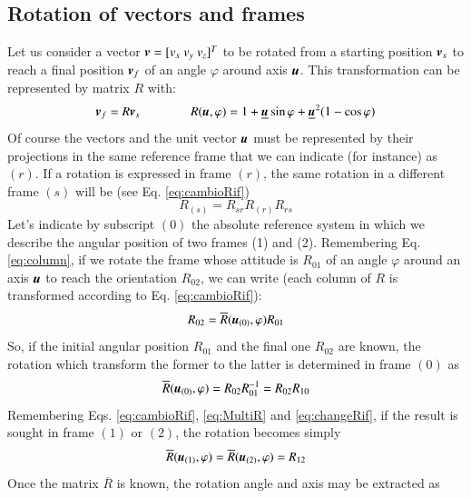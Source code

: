 \subsection{Rotation of vectors and frames}
\label{app:RotatMatrix2}
Let us consider a vector $\vect{v} = [v_x\ v_y\ v_z]^T$ to be rotated from a starting position ${\boldsymbol{v}}_s$ to reach a final position ${\boldsymbol{v}}_f$ of an angle $\varphi$ around axis ${\boldsymbol{u}}$. This transformation can be represented by matrix $R$ with:
\begin{equation}
    {\boldsymbol{v}}_f = R {\boldsymbol{v}}_s 
    \qquad\qquad 
    R({\boldsymbol{u}},\varphi) = 1 + \underline{{\boldsymbol{u}}}\sin\varphi + \underline{{\boldsymbol{u}}}^2(1-\cos\varphi)
    \label{eq:rotat_phi_u}
\end{equation}
Of course the vectors and the unit vector ${\boldsymbol{u}}$ must be represented by their projections in the same reference frame that we can indicate (for instance) as $(r)$. If a rotation is expressed in frame $(r)$, the same rotation in a different frame $(s)$ will be (see Eq. \ref{eq:cambioRif})
\begin{equation}
    R_{(s)}= R_{sr} R_{(r)} R_{rs}
    \label{eq:changeRif}
\end{equation}
Let's indicate by subscript $(0)$ the absolute reference system in which we describe the angular position of two frames (1) and (2).
Remembering Eq. \ref{eq:column}, if we rotate the frame whose attitude is $R_{01}$ of an angle $\varphi$ around an axis ${\boldsymbol{u}}$ to reach the orientation $R_{02}$, we can write (each column of $R$ is transformed according to Eq. \ref{eq:cambioRif}):
\begin{equation}
    R_{02}=\overline{R}({\boldsymbol{u}}_{(0)},\varphi) R_{01}
    \label{eq:rotR01_02}
\end{equation}
So, if the initial angular position $R_{01}$ and the final one $R_{02}$ are known, the rotation which transform the former to the latter is determined in frame $(0)$ as
\begin{equation}
    \overline{R}({\boldsymbol{u}}_{(0)},\varphi) = R_{02} R_{01}^{-1} = R_{02} R_{10}
    \label{eq:RotFrame0}
\end{equation}
Remembering Eqs. \ref{eq:cambioRif}, \ref{eq:MultiR} and \ref{eq:changeRif}, if the result is sought in frame $(1)$ or $(2)$, the rotation becomes simply
\begin{equation}
   \overline{R}({\boldsymbol{u}}_{(1)}, \varphi) = \overline{R}({\boldsymbol{u}}_{(2)},\varphi) = R_{12}
    \label{eq:RRR12}
\end{equation}
Once the matrix $\overline{R}$ is known, the rotation angle and axis may be extracted as
